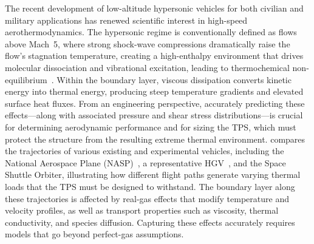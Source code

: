 
The recent development of low-altitude hypersonic vehicles for both civilian and military applications has renewed scientific interest in high-speed aerothermodynamics. The hypersonic regime is conventionally defined as flows above Mach~5, where strong shock-wave compressions dramatically raise the flow's stagnation temperature, creating a high-enthalpy environment that drives molecular dissociation and vibrational excitation, leading to thermochemical non-equilibrium~\citep{Candler2019}. Within the boundary layer, viscous dissipation converts kinetic energy into thermal energy, producing steep temperature gradients and elevated surface heat fluxes. From an engineering perspective, accurately predicting these effects---along with associated pressure and shear stress distributions---is crucial for determining aerodynamic performance and for sizing the \gls{TPS}, which must protect the structure from the resulting extreme thermal environment.  compares the trajectories of various existing and experimental vehicles, including the National Aerospace Plane (NASP)~\citep{DSB1988,DSB1992}, a representative \gls{HGV}~\citep{Rizvi2015}, and the Space Shuttle Orbiter, illustrating how different flight paths generate varying thermal loads that the \gls{TPS} must be designed to withstand. The boundary layer along these trajectories is affected by real-gas effects that modify temperature and velocity profiles, as well as transport properties such as viscosity, thermal conductivity, and species diffusion. Capturing these effects accurately requires models that go beyond perfect-gas assumptions.

